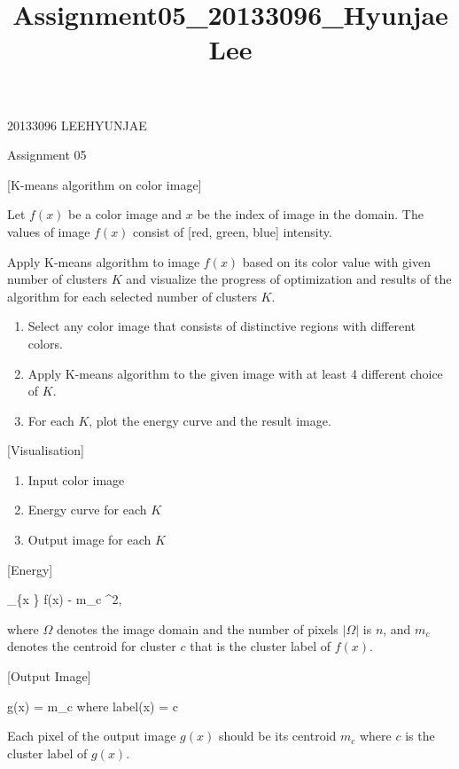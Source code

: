 \documentclass[11pt]{article}
\title{Assignment05\_20133096\_HyunjaeLee}
\providecommand{\tightlist}{%
      \setlength{\itemsep}{0pt}\setlength{\parskip}{0pt}}
\begin{document}
    
    
    \maketitle
    
    

    
    20133096 LEEHYUNJAE

Assignment 05

{[}K-means algorithm on color image{]}

Let \(f(x)\) be a color image and \(x\) be the index of image in the
domain. The values of image \(f(x)\) consist of {[}red, green, blue{]}
intensity.

Apply K-means algorithm to image \(f(x)\) based on its color value with
given number of clusters \(K\) and visualize the progress of
optimization and results of the algorithm for each selected number of
clusters \(K\).

\begin{enumerate}
\def\labelenumi{\arabic{enumi}.}
\tightlist
\item
  Select any color image that consists of distinctive regions with
  different colors.
\item
  Apply K-means algorithm to the given image with at least 4 different
  choice of \(K\).
\item
  For each \(K\), plot the energy curve and the result image.
\end{enumerate}

{[}Visualisation{]}

\begin{enumerate}
\def\labelenumi{\arabic{enumi}.}
\tightlist
\item
  Input color image
\item
  Energy curve for each \(K\)
\item
  Output image for each \(K\)
\end{enumerate}

{[}Energy{]}

 \sum\_\{x \in \Omega\} \textbar{} f(x) - m\_c \textbar\^{}2,

where \(\Omega\) denotes the image domain and the number of pixels
\(| \Omega |\) is \(n\), and \(m_c\) denotes the centroid for cluster
\(c\) that is the cluster label of \(f(x)\).

{[}Output Image{]}

g(x) = m\_c where label(x) = c

Each pixel of the output image \(g(x)\) should be its centroid \(m_c\)
where \(c\) is the cluster label of \(g(x)\).
\end{document}
